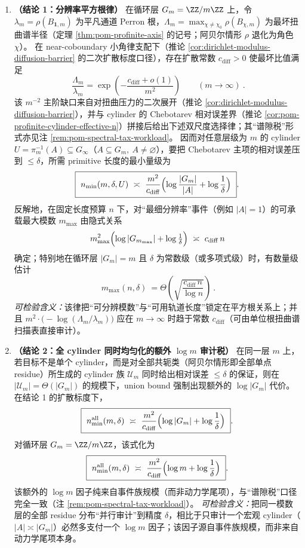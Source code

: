 \begin{enumerate}
  \item \textbf{（结论 1：分辨率平方根律）}
  在循环层 \(G_m=\ZZ/m\ZZ\) 上，令 \(\lambda_m=\rho(B_{\mathbf 1,m})\) 为平凡通道 Perron 根，\(\Lambda_m=\max_{\chi\neq \chi_0}\rho(B_{\chi,m})\) 为最坏扭曲谱半径（定理 \ref{thm:pom-profinite-axis} 的记号；阿贝尔情形 \(\rho\) 退化为角色 \(\chi\)）。
  在 near-coboundary 小角律支配下（推论 \ref{cor:dirichlet-modulus-diffusion-barrier} 的二次扩散标度口径），存在扩散常数 \(c_{\mathrm{diff}}>0\) 使最坏比值满足
  \[
  \boxed{\ \frac{\Lambda_m}{\lambda_m}
  =\exp\!\left(-\frac{c_{\mathrm{diff}}+o(1)}{m^2}\right)\qquad(m\to\infty)\ }.
  \]
  该 \(m^{-2}\) 主阶缺口来自对扭曲压力的二次展开（推论 \ref{cor:dirichlet-modulus-diffusion-barrier}），并与 cylinder 的 Chebotarev 相对误差界（推论 \ref{cor:pom-profinite-cylinder-effective-n}）拼接后给出下述双尺度选择律；其“谱隙税”形式亦见注 \ref{rem:pom-spectral-tax-workload}。
  因而对任意层级为 \(m\) 的 cylinder \(U=\pi_m^{-1}(A)\subseteq G_\infty\)（\(A\subseteq G_m,\ A\neq\varnothing\)），要把 Chebotarev 主项的相对误差压到 \(\le\delta\)，所需 primitive 长度的最小量级为
  \[
  \boxed{\ n_{\min}(m,\delta,U)\ \asymp\ \frac{m^2}{c_{\mathrm{diff}}}\Bigl(\log\frac{|G_m|}{|A|}+\log\frac{1}{\delta}\Bigr)\ }.
  \]
  反解地，在固定长度预算 \(n\) 下，对“最细分辨率”事件（例如 \(|A|=1\)）的可承载最大模数 \(m_{\max}\) 由隐式关系
  \[
  m_{\max}^2\Bigl(\log |G_{m_{\max}}|+\log\tfrac{1}{\delta}\Bigr)\ \asymp\ c_{\mathrm{diff}}\,n
  \]
  确定；特别地在循环层 \(|G_m|=m\) 且 \(\delta\) 为常数级（或多项式级）时，有数量级估计
  \[
  \boxed{\ m_{\max}(n,\delta)\ =\Theta\!\left(\sqrt{\frac{c_{\mathrm{diff}}\,n}{\log n}}\right)\ }.
  \]
  \emph{可检验含义：}该律把“可分辨模数”与“可用轨道长度”锁定在平方根关系上；并且 \(m^2\cdot\bigl(-\log(\Lambda_m/\lambda_m)\bigr)\) 应在 \(m\to\infty\) 时趋于常数 \(c_{\mathrm{diff}}\)（可由单位根扭曲谱扫描表直接审计）。

  \item \textbf{（结论 2：全 cylinder 同时均匀化的额外 \texorpdfstring{$\log m$}{log m} 审计税）}
  在同一层 \(m\) 上，若目标不是单个 cylinder，而是对全部共轭类（阿贝尔情形即全部单点 residue）所生成的 cylinder 族 \(\mathcal{U}_m\) 同时给出相对误差 \(\le\delta\) 的保证，则在 \(|\mathcal{U}_m|=\Theta(|G_m|)\) 的规模下，union bound 强制出现额外的 \(\log|G_m|\) 代价。
  在结论 1 的扩散标度下，
  \[
  \boxed{\ n_{\min}^{\mathrm{all}}(m,\delta)\ \asymp\ \frac{m^2}{c_{\mathrm{diff}}}\Bigl(\log |G_m|+\log\frac{1}{\delta}\Bigr)\ }.
  \]
  对循环层 \(G_m=\ZZ/m\ZZ\)，该式化为
  \[
  \boxed{\ n_{\min}^{\mathrm{all}}(m,\delta)\ \asymp\ \frac{m^2}{c_{\mathrm{diff}}}\Bigl(\log m+\log\frac{1}{\delta}\Bigr)\ }.
  \]
  该额外的 \(\log m\) 因子纯来自事件族规模（而非动力学尾项），与“谱隙税”口径完全一致（注 \ref{rem:pom-spectral-tax-workload}）。
  \emph{可检验含义：}把同一模数层的全部 residue 分布“并行审计”到精度 \(\delta\)，相比于只审计一个宏观 cylinder（\(|A|\asymp |G_m|\)）必然多支付一个 \(\log m\) 因子；该因子源自事件族规模，而非来自动力学尾项本身。


\end{enumerate}
